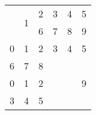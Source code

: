 \begin{tabular}{rrrrrr}
\multicolumn{2}{r}{\multirow{2}[0]{*}{1}} &
  2 &
  3 &
  4 &
  5
  \\
\multicolumn{2}{r}{} &
  6 &
  7 &
  8 &
  9
  \\
0 &
  1 &
  2 &
  3 &
  4 &
  5
  \\
6 &
  7 &
  8 &
  \multicolumn{3}{r}{\multirow{3}[0]{*}{9}}
  \\
0 &
  1 &
  2 &
  \multicolumn{3}{r}{}
  \\
3 &
  4 &
  5 &
  \multicolumn{3}{r}{}
  \\
\end{tabular}%
